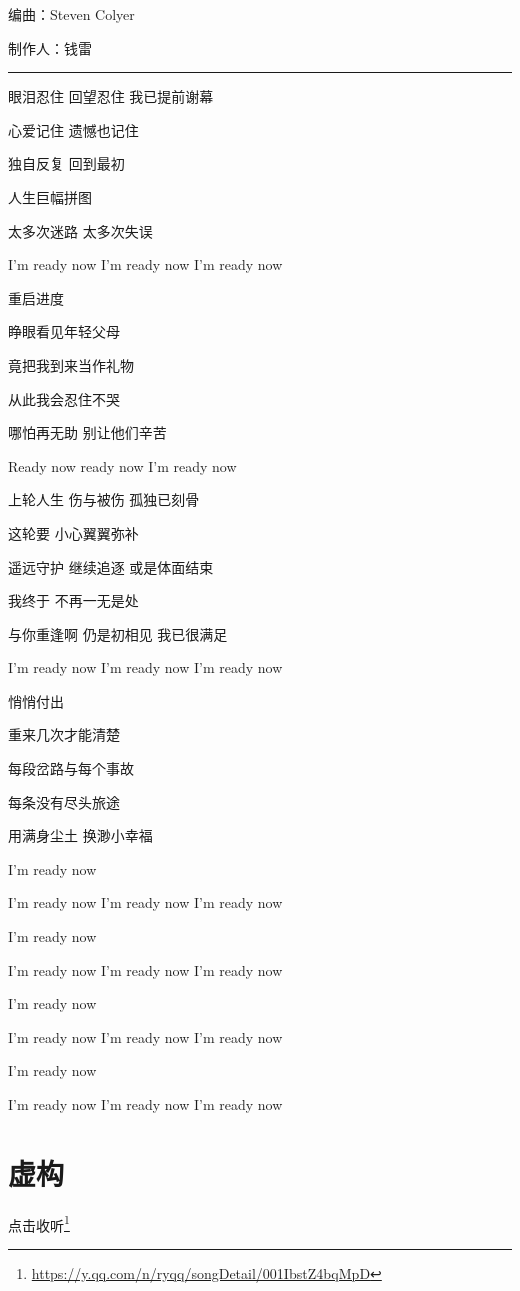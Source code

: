 \documentclass[]{ctexbook}
\renewcommand{\href}[2]{#2\footnote{\url{#1}}}
\begin{document}
编曲：Steven Colyer

制作人：钱雷

\begin{center}\rule{0.5\linewidth}{0.5pt}\end{center}

眼泪忍住 回望忍住 我已提前谢幕

心爱记住 遗憾也记住

独自反复 回到最初

人生巨幅拼图

太多次迷路 太多次失误

I'm ready now I'm ready now I'm ready now

重启进度

睁眼看见年轻父母

竟把我到来当作礼物

从此我会忍住不哭

哪怕再无助 别让他们辛苦

Ready now ready now I'm ready now

上轮人生 伤与被伤 孤独已刻骨

这轮要 小心翼翼弥补

遥远守护 继续追逐 或是体面结束

我终于 不再一无是处

与你重逢啊 仍是初相见 我已很满足

I'm ready now I'm ready now I'm ready now

悄悄付出

重来几次才能清楚

每段岔路与每个事故

每条没有尽头旅途

用满身尘土 换渺小幸福

I'm ready now

I'm ready now I'm ready now I'm ready now

I'm ready now

I'm ready now I'm ready now I'm ready now

I'm ready now

I'm ready now I'm ready now I'm ready now

I'm ready now

I'm ready now I'm ready now I'm ready now

\section*{虚构}\label{the-mask}


\href{https://y.qq.com/n/ryqq/songDetail/001IbstZ4bqMpD}{点击收听}
\end{document}
